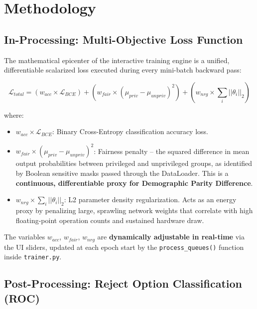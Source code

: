 \documentclass[12pt,a4paper]{article}
\begin{document}
\section{Methodology}

\subsection{In-Processing: Multi-Objective Loss Function}

The mathematical epicenter of the interactive training engine is a unified, differentiable scalarized loss executed during every mini-batch backward pass:

\begin{equation}
    \mathcal{L}_{total} = (w_{acc} \times \mathcal{L}_{BCE}) + (w_{fair} \times (\mu_{priv} - \mu_{unpriv})^2) + (w_{nrg} \times \sum_{i}||\theta_i||_2)
\end{equation}

\noindent where:

\begin{itemize}
    \item $w_{acc} \times \mathcal{L}_{BCE}$: Binary Cross-Entropy classification accuracy loss.
    \item $w_{fair} \times (\mu_{priv} - \mu_{unpriv})^2$: Fairness penalty -- the squared difference in mean output probabilities between privileged and unprivileged groups, as identified by Boolean sensitive masks passed through the DataLoader. This is a \textbf{continuous, differentiable proxy for Demographic Parity Difference}.
    \item $w_{nrg} \times \sum_{i}||\theta_i||_2$: L2 parameter density regularization. Acts as an energy proxy by penalizing large, sprawling network weights that correlate with high floating-point operation counts and sustained hardware draw.
\end{itemize}

The variables $w_{acc}$, $w_{fair}$, $w_{nrg}$ are \textbf{dynamically adjustable in real-time} via the UI sliders, updated at each epoch start by the \texttt{process\_queues()} function inside \texttt{trainer.py}.

\subsection{Post-Processing: Reject Option Classification (ROC)}
\end{document}
